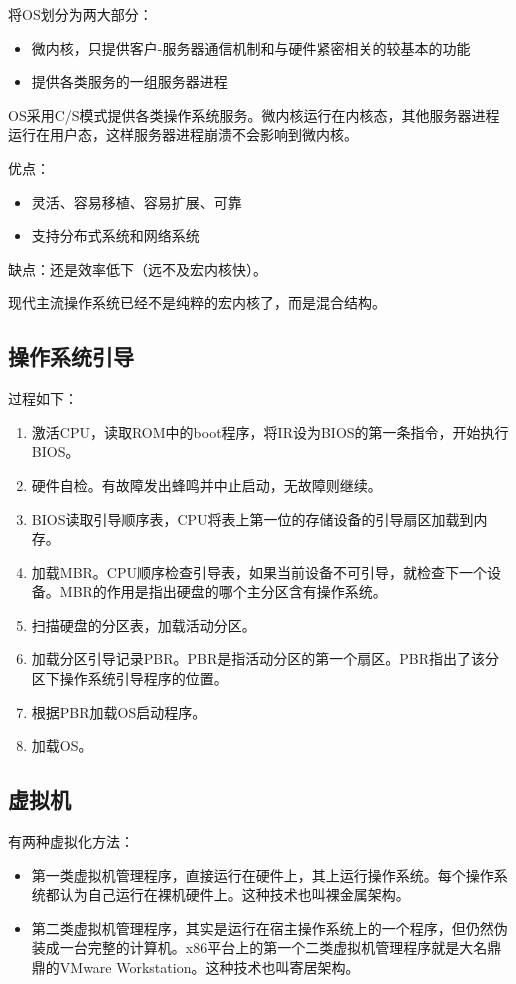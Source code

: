 \documentclass[12pt, a4paper, oneside]{ctexart}
\begin{document}
将OS划分为两大部分：
\begin{itemize}
    \item 微内核，只提供客户-服务器通信机制和与硬件紧密相关的较基本的功能
    \item 提供各类服务的一组服务器进程
\end{itemize}

OS采用C/S模式提供各类操作系统服务。微内核运行在内核态，其他服务器进程运行在用户态，这样服务器进程崩溃不会影响到微内核。

优点：
\begin{itemize}
    \item 灵活、容易移植、容易扩展、可靠
    \item 支持分布式系统和网络系统
\end{itemize}

缺点：还是效率低下（远不及宏内核快）。

现代主流操作系统已经不是纯粹的宏内核了，而是混合结构。

\subsection{操作系统引导}

过程如下：
\begin{enumerate}
  \item 激活CPU，读取ROM中的boot程序，将IR设为BIOS的第一条指令，开始执行BIOS。
  \item 硬件自检。有故障发出蜂鸣并中止启动，无故障则继续。
  \item BIOS读取引导顺序表，CPU将表上第一位的存储设备的引导扇区加载到内存。
  \item 加载MBR。CPU顺序检查引导表，如果当前设备不可引导，就检查下一个设备。MBR的作用是指出硬盘的哪个主分区含有操作系统。
  \item 扫描硬盘的分区表，加载活动分区。
  \item 加载分区引导记录PBR。PBR是指活动分区的第一个扇区。PBR指出了该分区下操作系统引导程序的位置。
  \item 根据PBR加载OS启动程序。
  \item 加载OS。
\end{enumerate}

\subsection{虚拟机}

有两种虚拟化方法：
\begin{itemize}
  \item 第一类虚拟机管理程序，直接运行在硬件上，其上运行操作系统。每个操作系统都认为自己运行在裸机硬件上。这种技术也叫裸金属架构。
  \item 第二类虚拟机管理程序，其实是运行在宿主操作系统上的一个程序，但仍然伪装成一台完整的计算机。x86平台上的第一个二类虚拟机管理程序就是大名鼎鼎的VMware Workstation。这种技术也叫寄居架构。
\end{itemize}
\end{document}
